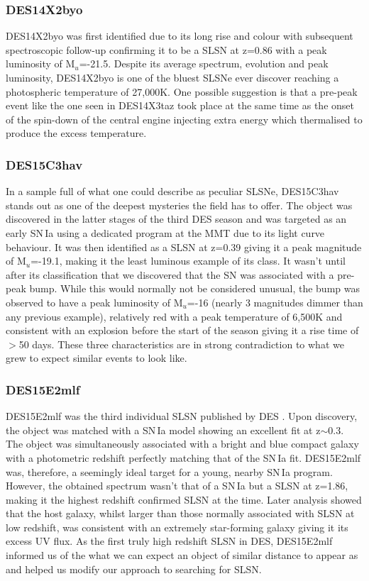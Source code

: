 \subsubsection{DES14X2byo}
DES14X2byo was first identified due to its long rise and colour with subsequent spectroscopic follow-up confirming it to be a SLSN at z=0.86 with a peak luminosity of M$_u$=-21.5. Despite its average spectrum, evolution and peak luminosity, DES14X2byo is one of the bluest SLSNe ever discover reaching a photospheric temperature of 27,000K. One possible suggestion is that a pre-peak event like the one seen in DES14X3taz took place at the same time as the onset of the spin-down of the central engine injecting extra energy which thermalised to produce the excess temperature.

\subsubsection{DES15C3hav}
In a sample full of what one could describe as peculiar SLSNe, DES15C3hav stands out as one of the deepest mysteries the field has to offer. The object was discovered in the latter stages of the third DES season and was targeted as an early SN\,Ia using a dedicated program at the MMT due to its light curve behaviour. It was then identified as a SLSN at z=0.39 giving it a peak magnitude of M$_u$=-19.1, making it the least luminous example of its class. It wasn't until after its classification that we discovered that the SN was associated with a pre-peak bump. While this would normally not be considered unusual, the bump was observed to have a peak luminosity of M$_u$=-16 (nearly 3 magnitudes dimmer than any previous example), relatively red with a peak temperature of 6,500K and consistent with an explosion before the start of the season giving it a rise time of $>$50 days. These three characteristics are in strong contradiction to what we grew to expect similar events to look like.

\subsubsection{DES15E2mlf}
DES15E2mlf was the third individual SLSN published by DES \citep{Pan2017}. Upon discovery, the object was matched with a SN\,Ia model showing an excellent fit at z$\sim$0.3. The object was simultaneously associated with a bright and blue compact galaxy with a photometric redshift perfectly matching that of the SN\,Ia fit. DES15E2mlf was, therefore, a seemingly ideal target for a young, nearby SN\,Ia program. However, the obtained spectrum wasn't that of a SN\,Ia but a SLSN at z=1.86, making it the highest redshift confirmed SLSN at the time. Later analysis showed that the host galaxy, whilst larger than those normally associated with SLSN at low redshift, was consistent with an extremely star-forming galaxy giving it its excess UV flux. As the first truly high redshift SLSN in DES, DES15E2mlf informed us of the what we can expect an object of similar distance to appear as and helped us modify our approach to searching for SLSN.

